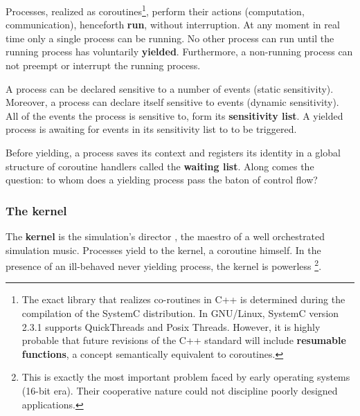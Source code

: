 \documentclass[11pt]{article}
\begin{document}
Processes, realized as coroutines\footnote{The exact library that realizes co-routines in C++ is determined during the compilation of the SystemC distribution. 
In GNU/Linux, SystemC version 2.3.1 supports QuickThreads and Posix Threads.
However, it is highly probable that future revisions of the C++ standard will include \textbf{resumable functions}, a concept semantically equivalent to coroutines.}, perform their actions (computation, communication), henceforth \textbf{run}, without interruption.
At any moment in real time only a single process can be running.
No other process can run until the running process has voluntarily \textbf{yielded}.
Furthermore, a non-running process can not preempt or interrupt the running process.

A process can be declared sensitive to a number of events (static sensitivity).
Moreover, a process can declare itself sensitive to events (dynamic sensitivity).
All of the events the process is sensitive to, form its \textbf{sensitivity list}.
A yielded process is awaiting for events in its sensitivity list to to be triggered.

Before yielding, a process saves its context and registers its identity in a global structure of coroutine handlers called the \textbf{waiting list}.
Along comes the question: to whom does a yielding process pass the baton of control flow?



\subsubsection{The kernel}
\label{sec:orgbd5e0a6}
The \textbf{kernel} is the simulation's director \cite{Editor2014}, the maestro of a well orchestrated simulation music.
Processes yield to the kernel, a coroutine himself.
In the presence of an ill-behaved never yielding process, the kernel is powerless \footnote{This is exactly the most important problem faced by early operating systems (16-bit era). 
Their cooperative nature could not discipline poorly designed applications.}.
\end{document}
